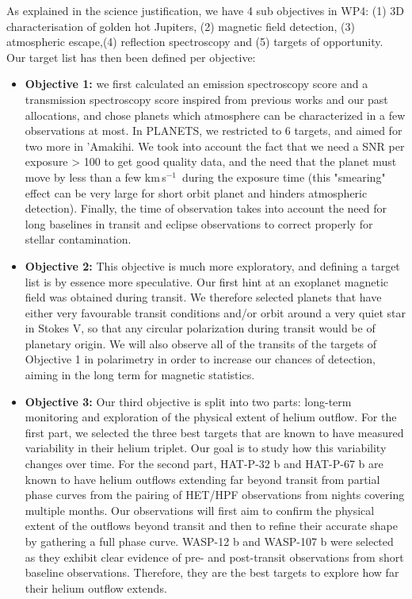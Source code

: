 \documentclass[
    traditabstract,
    longauth,
    onecolumn,
]{aa}
\def \kms{km\,s$^{-1}$}
\begin{document}
As explained in the science justification, we have 4 sub objectives in WP4: (1) 3D characterisation of golden hot Jupiters, (2) magnetic field detection, (3) atmospheric escape,(4) reflection spectroscopy and (5) targets of opportunity. 
Our target list has then been defined per objective:
\begin{itemize}
    \item {\bf Objective 1:} we first calculated an emission spectroscopy score and a transmission spectroscopy score inspired from previous works and our past allocations, and chose planets which atmosphere can be characterized in a few observations at most. In PLANETS, we restricted to 6 targets, and aimed for two more in 'Amakihi. We took into account the fact that we need a SNR per exposure > 100 to get good quality data, and the need that the planet must move by less than a few \kms\ during the exposure time (this "smearing" effect can be very large for short orbit planet and hinders atmospheric detection).  Finally, the time of observation takes into account the need for long baselines in transit and eclipse observations to correct properly for stellar contamination.

    \item {\bf Objective 2:} This objective is much more exploratory, and defining a target list is by essence more speculative. Our first hint at an exoplanet magnetic field was obtained during transit. We therefore selected planets that have either very favourable transit conditions and/or orbit around a very quiet star in Stokes V, so that any circular polarization during transit would be of planetary origin. We will also observe all of the transits of the targets of Objective 1 in polarimetry in order to increase our chances of detection, aiming in the long term for magnetic statistics.

    \item {\bf Objective 3:} Our third objective is split into two parts: long-term monitoring and exploration of the physical extent of helium outflow. For the first part, we selected the three best targets that are known to have measured variability in their helium triplet. Our goal is to study how this variability changes over time. For the second part, HAT-P-32 b and HAT-P-67 b are known to have helium outflows extending far beyond transit from partial phase curves from the pairing of HET/HPF observations from nights covering multiple months. Our observations will first aim to confirm the physical extent of the outflows beyond transit and then to refine their accurate shape by gathering a full phase curve. WASP-12 b and WASP-107 b were selected as they exhibit clear evidence of pre- and post-transit observations from short baseline observations. Therefore, they are the best targets to explore how far their helium outflow extends.


\end{itemize}
\end{document}
